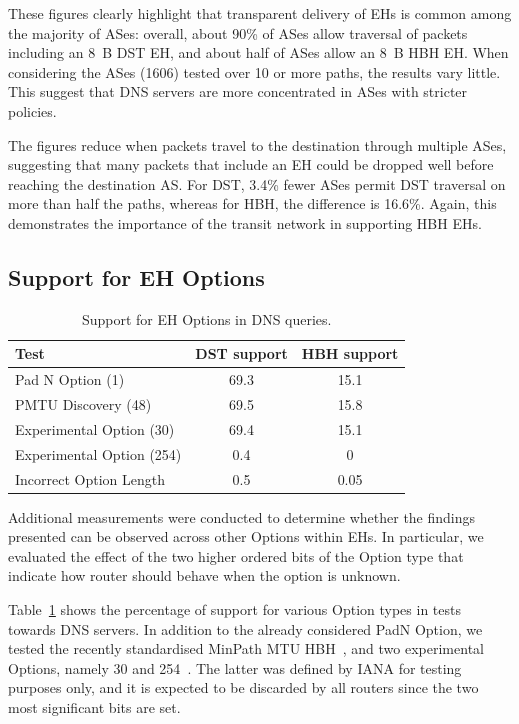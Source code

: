 \documentclass[conference]{IEEEtran}
\begin{document}
These figures clearly highlight that transparent delivery of EHs is common
among the majority of ASes: overall, about 90\% of ASes allow
traversal of packets including an 8~B DST EH, and about half of ASes allow an
8~B HBH EH.  When considering the ASes (1606) tested over 10 or more paths, the
results vary little.  This suggest that DNS servers are more concentrated in
ASes with stricter policies.

The figures reduce when packets travel to the destination
through multiple ASes, suggesting that many packets that include an EH could be
dropped well before reaching the destination AS. For DST, 3.4\% fewer ASes
permit DST traversal on more than half the paths, whereas for HBH, the
difference is 16.6\%. Again, this demonstrates the importance of the transit 
network in supporting HBH EHs. 

\subsection{Support for EH Options}

\begin{table}[t]
\centering 
\caption{Support for EH Options in DNS queries.}
\begin{tabular}{l|c|c}
Test                      & DST support & HBH support\\
\hline \hline
Pad N Option (1)          & 69.3        & 15.1       \\
PMTU Discovery (48)       & 69.5        & 15.8       \\
Experimental Option (30)  & 69.4        & 15.1       \\
Experimental Option (254) & 0.4         & 0          \\
Incorrect Option Length   & 0.5         & 0.05            
\end{tabular}
\label{tbl:option_type_support}
\end{table}

Additional measurements were conducted to determine whether the findings
presented can be observed across other Options within EHs.  In particular, we
evaluated the effect of the two higher ordered bits of the Option type
that indicate how router should behave when the option is unknown.

Table~\ref{tbl:option_type_support} shows the percentage of support for various
Option types in tests towards DNS servers.  In addition to the already
considered PadN Option, we tested the recently standardised MinPath MTU
HBH~\cite{rfc9268}, and two experimental Options, namely 30 and
254~\cite{RFC4727}.  The latter was defined by IANA for testing purposes
only, and it is expected to be discarded by all routers since the two most
significant bits are set.  
\end{document}
